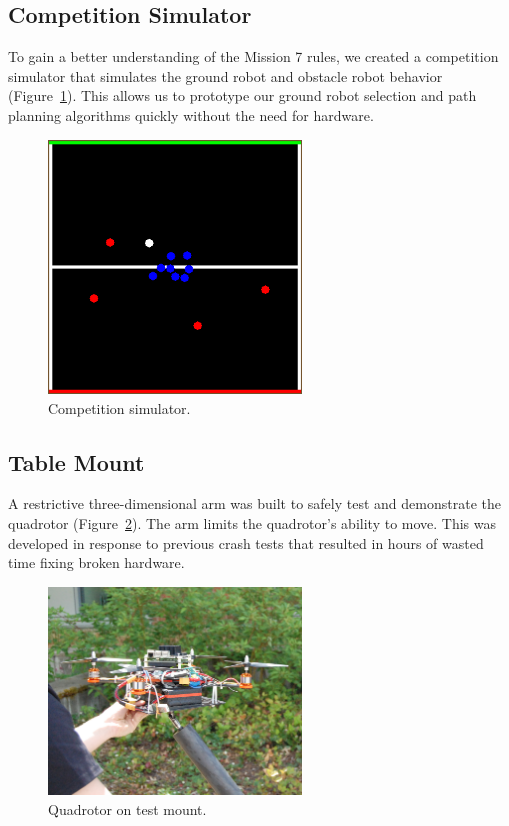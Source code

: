 \documentclass[12pt,letterpaper]{article} \usepackage[margin=1in]{geometry}
\begin{document}
\subsection*{Competition Simulator}

To gain a better understanding of the Mission 7 rules, we created a competition
simulator that simulates the ground robot and obstacle robot behavior
(Figure~\ref{fig:iarc_sim}). This allows us to prototype our ground robot
selection and path planning algorithms quickly without the need for hardware.

\begin{figure}[!h]
	\centering
	\includegraphics[width=0.6\textwidth]{img/iarc_sim.png}
	\caption{Competition simulator.}
	\label{fig:iarc_sim}
\end{figure}

\subsection*{Table Mount}

A restrictive three-dimensional arm was built to safely test and demonstrate
the quadrotor (Figure~\ref{fig:quad_test_mount}). The arm limits the
quadrotor's ability to move. This was developed in response to previous crash
tests that resulted in hours of wasted time fixing broken hardware.

\begin{figure}[!h]
	\centering
	\includegraphics[width=0.6\textwidth]{img/quad_test_mount.jpg}
	\caption{Quadrotor on test mount.}
	\label{fig:quad_test_mount}
\end{figure}
\end{document}

